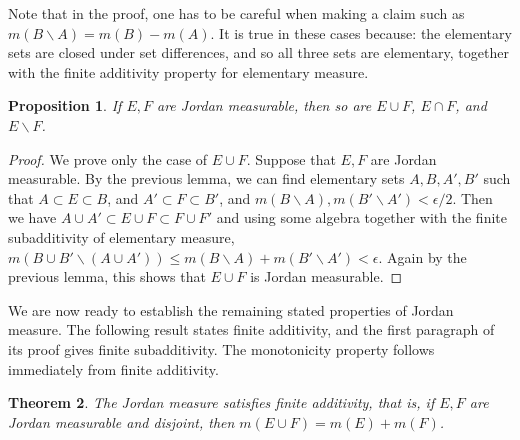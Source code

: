 \documentclass[11pt,oneside]{amsbook}
\renewcommand{\setminus}{\smallsetminus}
\theoremstyle{definition}
\theoremstyle{plain}
\newtheorem{thm}{Theorem}[section]
\newtheorem{prop}[thm]{Proposition}
\theoremstyle{definition}
\theoremstyle{remark}
\numberwithin{equation}{section}
\numberwithin{figure}{section}
\begin{document}
Note that in the proof, one has to be careful when making a claim such as $m(B\setminus A)=m(B)-m(A)$. It is true in these cases because: the elementary sets are closed under set differences, and so all three sets are elementary, together with the finite additivity property for elementary measure.

\begin{prop}
  If $E,F$ are Jordan measurable, then so are $E\cup F$, $E\cap F$, and $E\setminus F$.
\end{prop}

\begin{proof}
  We prove only the case of $E\cup F$. Suppose that $E,F$ are Jordan measurable. By the previous lemma, we can find elementary sets $A,B,A',B'$ such that $A\subset E\subset B$, and $A'\subset F\subset B'$, and $m(B\setminus A),m(B'\setminus A')<\epsilon/2$. Then we have $A\cup A'\subset E\cup F\subset F\cup F'$ and using some algebra together with the finite subadditivity of elementary measure, $m(B\cup B'\setminus(A\cup A'))\leq m(B\setminus A)+m(B'\setminus A')<\epsilon$. Again by the previous lemma, this shows that $E\cup F$ is Jordan measurable.
\end{proof}

We are now ready to establish the remaining stated properties of Jordan measure. The following result states finite additivity, and the first paragraph of its proof gives finite subadditivity. The monotonicity property follows immediately from finite additivity.

\begin{thm}
  The Jordan measure satisfies finite additivity, that is, if $E,F$ are Jordan measurable and disjoint, then $m(E\cup F)=m(E)+m(F)$.
\end{thm}
\end{document}
